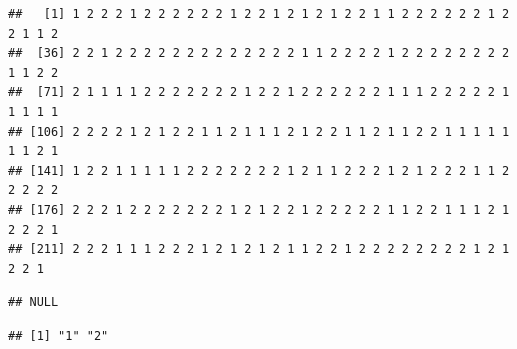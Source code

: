 \documentclass[10pt,ngerman,onside]{article}
\newenvironment{Shaded}{\begin{snugshade}}{\end{snugshade}}
\newcommand{\KeywordTok}[1]{\textcolor[rgb]{0.13,0.29,0.53}{\textbf{#1}}}
\newcommand{\StringTok}[1]{\textcolor[rgb]{0.31,0.60,0.02}{#1}}
\newcommand{\CommentTok}[1]{\textcolor[rgb]{0.56,0.35,0.01}{\textit{#1}}}
\newcommand{\OperatorTok}[1]{\textcolor[rgb]{0.81,0.36,0.00}{\textbf{#1}}}
\newcommand{\NormalTok}[1]{#1}
\begin{document}
\begin{Shaded}
\end{Shaded}

\begin{verbatim}
##   [1] 1 2 2 2 1 2 2 2 2 2 2 1 2 2 1 2 1 2 1 2 2 1 1 2 2 2 2 2 2 1 2 2 1 1 2
##  [36] 2 2 1 2 2 2 2 2 2 2 2 2 2 2 2 2 1 1 2 2 2 2 1 2 2 2 2 2 2 2 2 1 1 2 2
##  [71] 2 1 1 1 1 2 2 2 2 2 2 2 1 2 2 1 2 2 2 2 2 2 1 1 1 2 2 2 2 2 1 1 1 1 1
## [106] 2 2 2 2 1 2 1 2 2 1 1 2 1 1 1 2 1 2 2 1 1 2 1 1 2 2 1 1 1 1 1 1 1 2 1
## [141] 1 2 2 1 1 1 1 1 2 2 2 2 2 2 2 1 2 1 1 2 2 2 1 2 1 2 2 2 1 1 2 2 2 2 2
## [176] 2 2 2 1 2 2 2 2 2 2 2 1 2 1 2 2 1 2 2 2 2 2 1 1 2 2 1 1 1 2 1 2 2 2 1
## [211] 2 2 2 1 1 1 2 2 2 1 2 1 2 1 2 1 1 2 2 1 2 2 2 2 2 2 2 2 1 2 1 2 2 1
\end{verbatim}

\begin{Shaded}
\end{Shaded}

\begin{verbatim}
## NULL
\end{verbatim}

\begin{Shaded}
\end{Shaded}

\begin{verbatim}
## [1] "1" "2"
\end{verbatim}

\begin{Shaded}
\end{Shaded}
\end{document}
